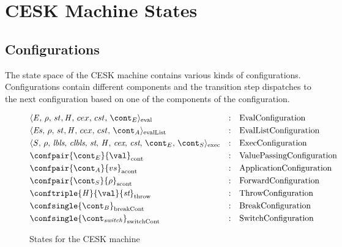\documentclass[a4paper,oneside,fleqn]{article}
\begin{document}
\section{CESK Machine States}
\subsection{Configurations}
\label{subsec:cesk-configs}

The state space of the CESK machine contains various kinds of configurations.
Configurations contain different components and the transition step dispatches to the next configuration based on one of the components of the configuration.

\newcommand{\breakconf}[1]{\confsingle{#1}_{\mathrm{breakCont}}}
\newcommand{\switchconf}[1]{\confsingle{#1}_{\mathrm{switchCont}}}
\newcommand{\contconf}[2]{\confpair{#1}{#2}_{\mathrm{cont}}}
\newcommand{\scontconf}[2]{\confpair{#1}{#2}_{\mathrm{scont}}}
\newcommand{\acontconf}[2]{\confpair{#1}{#2}_{\mathrm{acont}}}
\newcommand{\throwconf}[3]{\conftriple{#1}{#2}{#3}_{\mathrm{throw}}}
\newcommand{\evallistconf}[6]{\langle{#1},\,{#2},\,{#3},\handler,\,{#4},\,{#5},\,{#6}\rangle_{\mathrm{evalList}}}
\newcommand{\evalconf}[6]{\langle{#1},\,{#2},\,{#3},\handler,\,{#4},\,{#5},\,{#6}\rangle_{\mathrm{eval}}}
\newcommand{\execconf}[9]{\langle{#1},\,{#2},\,{#3},\,{#4},\,{#5},\,{#6},\,{#7},\,{#8},\,{#9}\rangle_{\mathrm{exec}}}

\begin{figure}[Htp]
  \begin{eqfigure}
  \begin{align}
    &\evalconf{\expr}{\env}{st}{cex}{cst}{\econt} & :\quad & \text{EvalConfiguration} \label{config:eval}\\
    &\evallistconf{\exprs}{\env}{st}{cex}{cst}{\acont} & :\quad & \text{EvalListConfiguration} \label{config:evallist}\\
    &\execconf{\stmt}{\env}{\lbls}{\clbls}{\strace}{\handler}{\cex,\,\cstrace}{\econt}{\scont}  & :\quad & \text{ExecConfiguration} \label{config:exec}\\
    &\contconf{\econt}{\val} & :\quad & \text{ValuePassingConfiguration} \label{config:econt}\\
    &\acontconf{\acont}{\vals} & :\quad & \text{ApplicationConfiguration} \label{config:acont}\\
    &\scontconf{\scont}{\env} & :\quad & \text{ForwardConfiguration} \label{config:scont}\\
    &\throwconf{\handler}{\val}{\strace} & :\quad & \text{ThrowConfiguration} \label{config:throw}\\
    &\breakconf{\bcont} & :\quad & \text{BreakConfiguration} \label{config:bcont}\\
    &\switchconf{\switchcont} & :\quad &
    \text{SwitchConfiguration}
    \label{config:switchcont}
  \end{align}
  \caption{States for the CESK machine}
  \end{eqfigure}
\end{figure}
\end{document}
